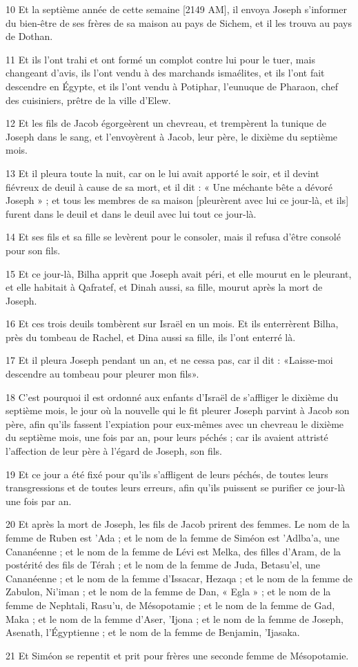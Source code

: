 \par 10 Et la septième année de cette semaine [2149 AM], il envoya Joseph s'informer du bien-être de ses frères de sa maison au pays de Sichem, et il les trouva au pays de Dothan.
\par 11 Et ils l'ont trahi et ont formé un complot contre lui pour le tuer, mais changeant d'avis, ils l'ont vendu à des marchands ismaélites, et ils l'ont fait descendre en Égypte, et ils l'ont vendu à Potiphar, l'eunuque de Pharaon, chef des cuisiniers, prêtre de la ville d'Elew.
\par 12 Et les fils de Jacob égorgeèrent un chevreau, et trempèrent la tunique de Joseph dans le sang, et l'envoyèrent à Jacob, leur père, le dixième du septième mois.
\par 13 Et il pleura toute la nuit, car on le lui avait apporté le soir, et il devint fiévreux de deuil à cause de sa mort, et il dit : « Une méchante bête a dévoré Joseph » ; et tous les membres de sa maison [pleurèrent avec lui ce jour-là, et ils] furent dans le deuil et dans le deuil avec lui tout ce jour-là.
\par 14 Et ses fils et sa fille se levèrent pour le consoler, mais il refusa d'être consolé pour son fils.
\par 15 Et ce jour-là, Bilha apprit que Joseph avait péri, et elle mourut en le pleurant, et elle habitait à Qafratef, et Dinah aussi, sa fille, mourut après la mort de Joseph.
\par 16 Et ces trois deuils tombèrent sur Israël en un mois. Et ils enterrèrent Bilha, près du tombeau de Rachel, et Dina aussi sa fille, ils l'ont enterré là.
\par 17 Et il pleura Joseph pendant un an, et ne cessa pas, car il dit : «Laisse-moi descendre au tombeau pour pleurer mon fils».
\par 18 C'est pourquoi il est ordonné aux enfants d'Israël de s'affliger le dixième du septième mois, le jour où la nouvelle qui le fit pleurer Joseph parvint à Jacob son père, afin qu'ils fassent l'expiation pour eux-mêmes avec un chevreau le dixième du septième mois, une fois par an, pour leurs péchés ; car ils avaient attristé l'affection de leur père à l'égard de Joseph, son fils.
\par 19 Et ce jour a été fixé pour qu'ils s'affligent de leurs péchés, de toutes leurs transgressions et de toutes leurs erreurs, afin qu'ils puissent se purifier ce jour-là une fois par an.
\par 20 Et après la mort de Joseph, les fils de Jacob prirent des femmes. Le nom de la femme de Ruben est 'Ada ; et le nom de la femme de Siméon est 'Adlba'a, une Cananéenne ; et le nom de la femme de Lévi est Melka, des filles d'Aram, de la postérité des fils de Térah ; et le nom de la femme de Juda, Betasu'el, une Cananéenne ; et le nom de la femme d'Issacar, Hezaqa ; et le nom de la femme de Zabulon, Ni'iman ; et le nom de la femme de Dan, « Egla » ; et le nom de la femme de Nephtali, Rasu'u, de Mésopotamie ; et le nom de la femme de Gad, Maka ; et le nom de la femme d'Aser, 'Ijona ; et le nom de la femme de Joseph, Asenath, l'Égyptienne ; et le nom de la femme de Benjamin, 'Ijasaka.
\par 21 Et Siméon se repentit et prit pour frères une seconde femme de Mésopotamie.

